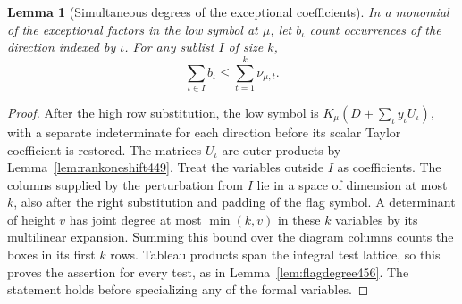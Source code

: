\documentclass[a4paper,11pt]{article}
\newtheorem{lemma}[proposition]{Lemma}
\theoremstyle{definition}
\theoremstyle{remark}
\numberwithin{equation}{section}
\begin{document}
\begin{lemma}[Simultaneous degrees of the exceptional coefficients]\leavevmode
\label{lem:jointdirections461}
In a monomial of the exceptional factors in the low symbol at
\(\mu\), let \(b_\iota\) count occurrences of the direction
indexed by \(\iota\). For any sublist \(I\) of size \(k\),
\[
             \sum_{\iota\in I} b_\iota
                            \le\sum_{t=1}^k\nu_{\mu,t}.
\]
\end{lemma}
\begin{proof}
After the high row substitution, the low symbol is
\(K_\mu(D+\sum_\iota y_\iota U_\iota)\), with a separate
indeterminate for each direction before its scalar Taylor
coefficient is restored. The matrices \(U_\iota\) are outer
products by Lemma~\ref{lem:rankoneshift449}. Treat the variables
outside \(I\) as coefficients. The columns supplied by the
perturbation from \(I\) lie in a space of dimension at most
\(k\), also after the right substitution and padding of the
flag symbol. A determinant of height \(v\) has joint degree at
most \(\min(k,v)\) in these \(k\) variables by its multilinear
expansion. Summing this bound over the diagram columns counts
the boxes in its first \(k\) rows. Tableau products span the
integral test lattice, so this proves the assertion for every
test, as in Lemma~\ref{lem:flagdegree456}. The statement holds
before specializing any of the formal variables.
\end{proof}
\end{document}

